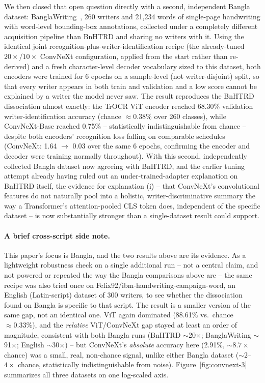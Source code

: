 \documentclass[a4paper,fleqn]{cas-dc}
\begin{document}
We then closed that open question directly with a second, independent
Bangla dataset: BanglaWriting~\citep{mridha2021banglawriting}, 260
writers and 21,234 words of single-page handwriting with word-level
bounding-box annotations, collected under a completely different
acquisition pipeline than BnHTRD and sharing no writers with it. Using
the identical joint recognition-plus-writer-identification recipe (the
already-tuned $20\times$/$10\times$ ConvNeXt configuration, applied from
the start rather than re-derived) and a fresh character-level decoder
vocabulary sized to this dataset, both encoders were trained for 6
epochs on a sample-level (not writer-disjoint) split, so that every
writer appears in both train and validation and a low score cannot be
explained by a writer the model never saw. The result reproduces the
BnHTRD dissociation almost exactly: the TrOCR ViT encoder reached
68.30\% validation writer-identification accuracy (chance $\approx
0.38\%$ over 260 classes), while ConvNeXt-Base reached 0.75\% --
statistically indistinguishable from chance -- despite both encoders'
recognition loss falling on comparable schedules (ConvNeXt: 1.64 $\to$
0.03 over the same 6 epochs, confirming the encoder and decoder were
training normally throughout). With this second, independently
collected Bangla dataset now agreeing with BnHTRD, and the earlier
tuning attempt already having ruled out an under-trained-adapter
explanation on BnHTRD itself, the evidence for explanation (i) -- that
ConvNeXt's convolutional features do not naturally pool into a
holistic, writer-discriminative summary the way a Transformer's
attention-pooled CLS token does, independent of the specific dataset --
is now substantially stronger than a single-dataset result could
support.

\paragraph{A brief cross-script side note.} This paper's focus is Bangla,
and the two results above are its evidence. As a lightweight robustness
check on a single additional run -- not a central claim, and not powered
or repeated the way the Bangla comparisons above are -- the same recipe
was also tried once on Felix92/ibm-handwriting-campaign-word, an English
(Latin-script) dataset of 300 writers, to see whether the dissociation
found on Bangla is specific to that script. The result is a smaller
version of the same gap, not an identical one. ViT again dominated
(88.61\% vs.\ chance $\approx 0.33\%$), and the \emph{relative}
ViT/ConvNeXt gap stayed at least an order of magnitude, consistent with
both Bangla runs (BnHTRD $\sim$20$\times$; BanglaWriting $\sim$91$\times$;
English $\sim$30$\times$) -- but ConvNeXt's \emph{absolute} accuracy here
(2.91\%, $\sim 8.7\times$ chance) was a small, real, non-chance signal,
unlike either Bangla dataset ($\sim2$--$4\times$ chance, statistically
indistinguishable from noise). Figure~\ref{fig:convnext-3} summarizes all
three datasets on one log-scaled axis.
\end{document}
